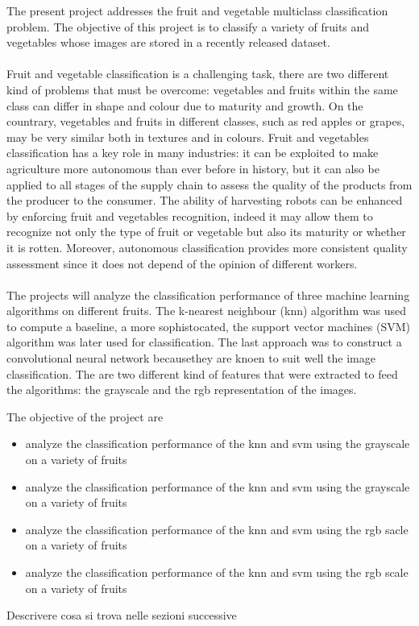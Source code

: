 \documentclass{article}
\begin{document}
The present project addresses the fruit and vegetable multiclass classification problem. The objective of this project is to classify a variety of fruits and vegetables whose images are stored in a recently released dataset.\\
\\
Fruit and vegetable classification is a challenging task, there are two different kind of problems that must be overcome: vegetables and fruits within the same class can differ in shape and colour due to maturity and growth. On the countrary, vegetables and fruits in different classes, such as red apples or grapes, may be very similar both in textures and in colours. 
Fruit and vegetables classification has a key role in many industries: it can be exploited to make agriculture more autonomous than ever before in history, but it can also be applied to all stages of the supply chain to assess the quality of the products from the producer to the consumer. 
The ability of harvesting robots can be enhanced by enforcing fruit and vegetables recognition, indeed it may allow them to recognize not only the type of fruit or vegetable but also its maturity or whether it is rotten. Moreover, autonomous classification provides more consistent quality assessment since it does not depend of the opinion of different workers.
\\\\
The projects will analyze the classification performance of three machine learning algorithms on different fruits. The k-nearest neighbour (knn) algorithm was used to compute a baseline, a more sophistocated, the support vector machines (SVM) algorithm was later used for classification. The last approach was to construct a convolutional neural network becausethey are knoen to suit well the image classification. The are two different kind of features that were extracted to feed the algorithms: the grayscale and the rgb representation of the images.

The objective of the project are
\begin{itemize}
\item analyze the classification performance of the knn and svm using the grayscale on a variety of fruits
\item analyze the classification performance of the knn and svm using the grayscale on a variety of fruits
\item analyze the classification performance of the knn and svm using the rgb sacle on a variety of fruits
\item analyze the classification performance of the knn and svm using the rgb scale on a variety of fruits
\end{itemize}
Descrivere cosa si trova nelle sezioni successive
\end{document}
